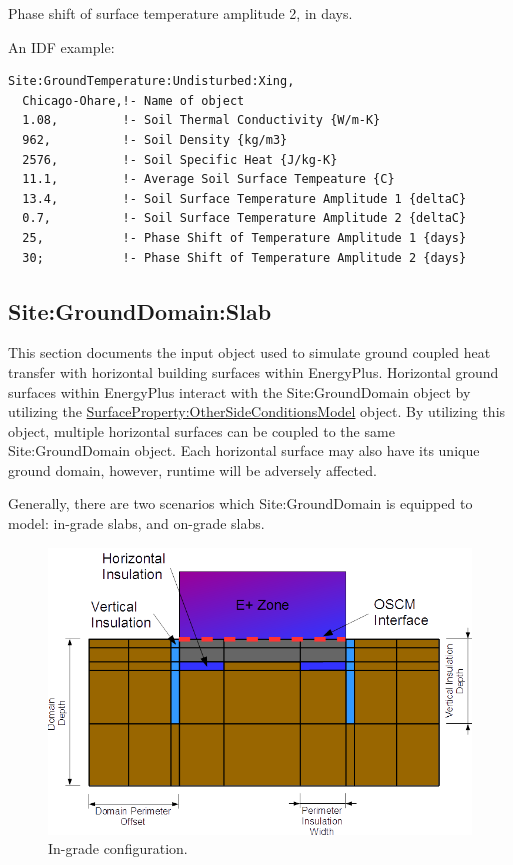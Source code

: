 Phase shift of surface temperature amplitude 2, in days.

An IDF example:

\begin{lstlisting}
Site:GroundTemperature:Undisturbed:Xing,
  Chicago-Ohare,!- Name of object
  1.08,         !- Soil Thermal Conductivity {W/m-K}
  962,          !- Soil Density {kg/m3}
  2576,         !- Soil Specific Heat {J/kg-K}
  11.1,         !- Average Soil Surface Tempeature {C}
  13.4,         !- Soil Surface Temperature Amplitude 1 {deltaC}
  0.7,          !- Soil Surface Temperature Amplitude 2 {deltaC}
  25,           !- Phase Shift of Temperature Amplitude 1 {days}
  30;           !- Phase Shift of Temperature Amplitude 2 {days}
\end{lstlisting}

\subsection{Site:GroundDomain:Slab}\label{sitegrounddomainslab}

This section documents the input object used to simulate ground coupled heat transfer with horizontal building surfaces within EnergyPlus. Horizontal ground surfaces within EnergyPlus interact with the Site:GroundDomain object by utilizing the \hyperref[surfacepropertyothersideconditionsmodel]{SurfaceProperty:OtherSideConditionsModel} object. By utilizing this object, multiple horizontal surfaces can be coupled to the same Site:GroundDomain object. Each horizontal surface may also have its unique ground domain, however, runtime will be adversely affected.

Generally, there are two scenarios which Site:GroundDomain is equipped to model: in-grade slabs, and on-grade slabs.

\begin{figure}[htbp]
\centering
\includegraphics{media/image012.png}
\caption{In-grade configuration. \protect \label{fig:in-grade-configuration}}
\end{figure}


